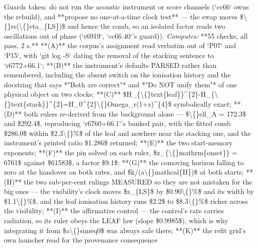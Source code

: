 \begin{description}
Guards taken: do not run the acoustic instrument or score channels (`cc66` owns the rebuild), and **propose no one-at-a-time clock test** --- the swap moves \$\textbackslash\{\}rs(\textbackslash\{\}eta\_\{LS\})\$ and hence the comb, so an isolated factor reads two oscillations out of phase (`r6919`, `cc66.40`'s guard)). 
\emph{Computes:} **55 checks, all pass, 2 s.** **(A)** the corpus's assignment read verbatim out of `P07` and `P15`, with `git log -S` dating the removal of the stacking sentence to `r6772+66.1`; **(B)** the instrument's defaults PARSED rather than remembered, including the absent switch on the ionisation history and the docstring that says *"Both are correct"* and *"Do NOT unify them"* of one physical object on two clocks; **(C)** \$H\_\{\textbackslash\{\}text\{leaf\}\}\textasciicircum{}\{2\}-H\_\{\textbackslash\{\}text\{stack\}\}\textasciicircum{}\{2\}=H\_0\textasciicircum{}\{2\}\textbackslash\{\}Omega\_r(1+z)\textasciicircum{}\{4\}\$ symbolically exact; **(D)** both rulers re-derived from the background alone --- \$\textbackslash\{\}ell\_A = 172.3\$ and \$292.4\$, reproducing `r6760+66.1`'s banked pair, with the fitted comb \$286.0\$ within \$2.3\textbackslash\{\}\%\$ of the leaf and nowhere near the stacking one, and the instrument's printed ratio \$1.286\$ returned; **(E)** the two start-memory exponents; **(F)** the pin solved on each ruler, \$z\_\{\textbackslash\{\}mathrm\{onset\}\} = 6761\$ against \$61583\$, a factor \$9.1\$; **(G)** the comoving horizon falling to zero at the handover on both rates, and \$k/(a\textbackslash\{\}mathcal\{H\})\$ at both starts; **(H)** the two sub-per-cent rulings MEASURED so they are not mistaken for the big ones --- the visibility's clock moves \$z\_\{LS\}\$ by \$0.90\textbackslash\{\}\%\$ and its width by \$1.1\textbackslash\{\}\%\$, and the leaf ionisation history runs \$2.2\$ to \$8.3\textbackslash\{\}\%\$ richer across the visibility; **(I)** the affirmative control --- the control's rate carries radiation, so its ruler obeys the LEAF law (slope \$0.9985\$), which is why integrating it from \$a\textbackslash\{\}simeq0\$ was always safe there; **(K)** the refit grid's own launcher read for the provenance consequence

\end{description}
